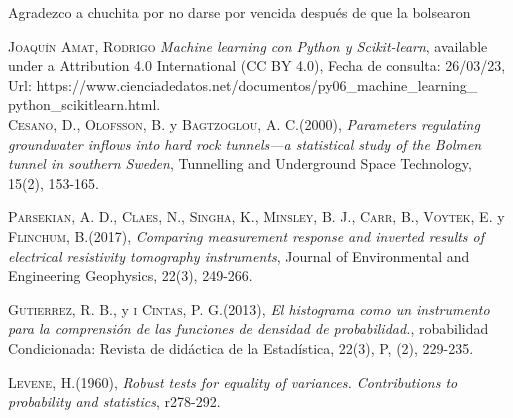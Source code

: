 \documentclass[sn-mathphys,Numbered]{sn-jnl}%
\theoremstyle{thmstyleone}%
\theoremstyle{thmstyletwo}%
\theoremstyle{thmstylethree}%
\begin{document}
Agradezco a chuchita por no darse por vencida después de que la bolsearon










	\begin{thebibliography}{X}\label{sec7}
	
	 \textsc{Joaquín Amat, Rodrigo}
	\textit{Machine learning con Python y Scikit-learn}, available under a Attribution 4.0 International (CC BY 4.0), Fecha de consulta: 26/03/23,\\
	Url: https://www.cienciadedatos.net/documentos/py06\_machine\_learning\_\\
	python\_scikitlearn.html.\\
	
	 \textsc{Cesano, D., Olofsson, B.} y \textsc{Bagtzoglou, A. C.}(2000),
	\textit{Parameters regulating groundwater inflows into hard rock tunnels—a statistical study of the Bolmen tunnel in southern Sweden}, Tunnelling and Underground Space Technology, 15(2), 153-165.
	
	 \textsc{Parsekian, A. D., Claes, N., Singha, K., Minsley, B. J., Carr, B., Voytek, E.} y \textsc{Flinchum, B.}(2017),
	\textit{Comparing measurement response and inverted results of electrical resistivity tomography instruments}, Journal of Environmental and Engineering Geophysics, 22(3), 249-266.
	
	
	 \textsc{Gutierrez, R. B.,} y \textsc{i Cintas, P. G.}(2013),
	\textit{El histograma como un instrumento para la comprensión de las funciones de densidad de probabilidad.}, robabilidad Condicionada: Revista de didáctica de la Estadística, 22(3), P, (2), 229-235.
	
	 \textsc{Levene, H.}(1960),
	\textit{Robust tests for equality of variances. Contributions to probability and statistics}, r278-292.
	
	\end{thebibliography}
\end{document}
